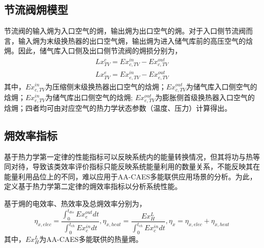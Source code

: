 \subsection{节流阀㶲模型}
 节流阀的输入㶲为入口空气的㶲，输出㶲为出口空气的㶲。对于入口侧节流阀而言，输入㶲为末级换热器的出口空气㶲，输出㶲为进入储气库前的高压空气的焓㶲。因此，储气库入口侧及出口侧节流阀的㶲损分别为，
\begin{subequations}
\label{eq:exergy-TV}
\begin{gather}
Lx_{TV}^c = Ex_{c,TV}^{in} - Ex_{c,TV}^{out} \label{equ:throttle-valve-comp-exergy-loss}\\
Lx_{TV}^e = Ex_{e,TV}^{in} - Ex_{e,TV}^{out} \label{equ:throttle-valve-turb-exergy-loss}
\end{gather}
\end{subequations}
其中，$Ex_{c,TV}^{in}$为压缩侧末级换热器出口空气的焓㶲；$Ex_{c,TV}^{out}$为储气库入口侧空气的焓㶲；$Ex_{e,TV}^{in}$为储气库出口侧空气的焓㶲; $Ex_{e,TV}^{out}$为膨胀侧首级换热器入口空气的焓㶲；四者均可由对应空气的热力学状态参数（温度、压力）计算得出。



\subsection{㶲效率指标}
基于热力学第一定律的性能指标可以反映系统内的能量转换情况，但其将功与热等同对待，导致该类效率评价指标只能反映系统能量利用的数量关系，不能反映其在能量利用品位上的不同，难以应用于AA-CAES多能联供应用场景的分析。为此，定义基于热力学第二定律的㶲效率指标以分析系统性能。

基于㶲的电效率、热效率及总㶲效率分别为，
\begin{equation}
{\eta _{x,elec}} = \frac{{\int_0^{{t_{dis}}} {Ex_e^{out}dt} }}{{\int_0^{{t_{ch}}} {Ex_c^{in}dt} }},{\eta _{x,heat}} = \frac{{Ex_H^L}}{{\int_0^{{t_{ch}}} {Ex_c^{in}dt} }}, {\eta _x} = {\eta _{x,elec}} + {\eta _{x,heat}}
\end{equation}
其中，${Ex_H^L}$为AA-CAES多能联供的热量㶲。

